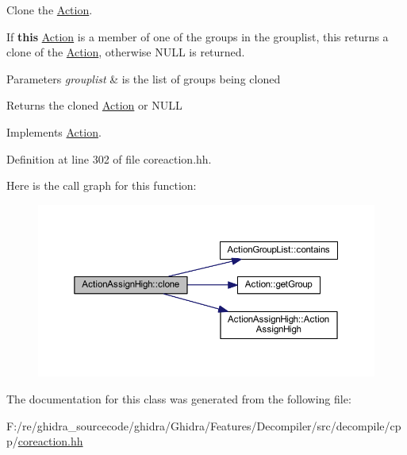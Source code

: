 Clone the \mbox{\hyperlink{class_action}{Action}}. 

If {\bfseries{this}} \mbox{\hyperlink{class_action}{Action}} is a member of one of the groups in the grouplist, this returns a clone of the \mbox{\hyperlink{class_action}{Action}}, otherwise N\+U\+LL is returned. 
\begin{DoxyParams}{Parameters}
{\em grouplist} & is the list of groups being cloned \\
\hline
\end{DoxyParams}
\begin{DoxyReturn}{Returns}
the cloned \mbox{\hyperlink{class_action}{Action}} or N\+U\+LL 
\end{DoxyReturn}


Implements \mbox{\hyperlink{class_action_af8242e41d09e5df52f97df9e65cc626f}{Action}}.



Definition at line 302 of file coreaction.\+hh.

Here is the call graph for this function\+:
\nopagebreak
\begin{figure}[H]
\begin{center}
\leavevmode
\includegraphics[width=350pt]{class_action_assign_high_aeb37b16d8fa8f7393f39c7d2c38b8da9_cgraph}
\end{center}
\end{figure}


The documentation for this class was generated from the following file\+:\begin{DoxyCompactItemize}
\item 
F\+:/re/ghidra\+\_\+sourcecode/ghidra/\+Ghidra/\+Features/\+Decompiler/src/decompile/cpp/\mbox{\hyperlink{coreaction_8hh}{coreaction.\+hh}}\end{DoxyCompactItemize}
